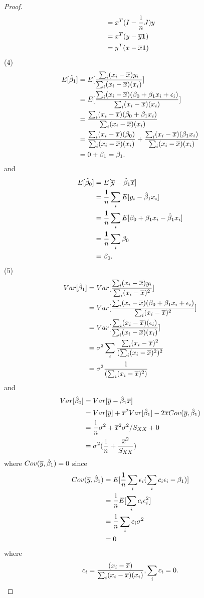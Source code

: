 \begin{refsection}
\begin{proof}
\begin{align*}
&= x^T(I-\frac{1}{n}J)y \\
&= x^T(y-\overline{y}\bm{1}) \\ 
&= y^T(x-\overline{x}\bm{1})
\end{align*}
(4)
\begin{align*}
E[\hat{\beta}_1] &= E[\frac{\sum_i (x_{i}-\overline{x})y_i }{\sum_i (x_{i}-\overline{x})(x_i)}] \\
&= E[\frac{\sum_i (x_{i}-\overline{x})(\beta_0+\beta_1x_i+\epsilon_i)}{\sum_i (x_{i}-\overline{x})(x_i)}] \\
&=\frac{\sum_i (x_{i}-\overline{x})(\beta_0+\beta_1x_i)}{\sum_i (x_{i}-\overline{x})(x_i)} \\
&=\frac{\sum_i (x_{i}-\overline{x})(\beta_0)}{\sum_i (x_{i}-\overline{x})(x_i)} + \frac{\sum_i (x_{i}-\overline{x})(\beta_1x_i)}{\sum_i (x_{i}-\overline{x})(x_i)} \\
&= 0 + \beta_1 = \beta_1.
\end{align*}
and
\begin{align*}
E[\hat{\beta}_0] &= E[\overline{y} - \hat{\beta}_1\overline{x}] \\
 &= \frac{1}{n}\sum_i E[y_i - \hat{\beta}_1x_i] \\
 &=\frac{1}{n}\sum_i E[\beta_0 + \beta_1x_i - \hat{\beta}_1x_i] \\
 &=\frac{1}{n}\sum_i \beta_0 \\
 &=\beta_0. 
\end{align*}
(5)
\begin{align*}
Var[\hat{\beta}_1] &= Var[\frac{\sum_i (x_{i}-\overline{x})y_i }{\sum_i (x_{i}-\overline{x})^2}] \\
&= Var[\frac{\sum_i (x_{i}-\overline{x})(\beta_0+\beta_1x_i+\epsilon_i)}{\sum_i (x_{i}-\overline{x})^2}] \\
&= Var[\frac{\sum_i (x_{i}-\overline{x})(\epsilon_i)}{\sum_i (x_{i}-\overline{x})(x_i)}] \\
&=\sigma^2 \sum_i \frac{\sum_i (x_{i}-\overline{x})^2}{(\sum_i (x_{i}-\overline{x})^2)^2}\\
&=\sigma^2 \frac{1}{(\sum_i (x_{i}-\overline{x})^2)}
\end{align*}
and
\begin{align*}
Var[\hat{\beta}_0] &= Var[\overline{y} - \hat{\beta}_1\overline{x}] \\
&=Var[\overline{y}] + \overline{x}^2Var[\hat{\beta}_1] -2\overline{x}Cov(\overline{y},\hat{\beta}_1)\\
&= \frac{1}{n}\sigma^2 + \overline{x}^2\sigma^2/S_{XX} + 0 \\
&=\sigma^2(\frac{1}{n} + \frac{\overline{x}^2}{S_{XX}})
\end{align*}
where $Cov(\overline{y},\hat{\beta}_1) = 0$ since
\begin{align*}
Cov(\overline{y},\hat{\beta}_1) & = E[\frac{1}{n}\sum_{i} \epsilon_i (\sum_{i}c_i\epsilon_i -\beta_1)] \\
&=\frac{1}{n}E[\sum_i c_i \epsilon_i^2] \\
&=\frac{1}{n}\sum_i c_i \sigma^2\\
&=0
\end{align*}
where 
$$c_i =\frac{ (x_{i}-\overline{x})}{\sum_i (x_{i}-\overline{x})(x_i)}, \sum_i c_i = 0.$$


\end{proof}
\end{refsection}
